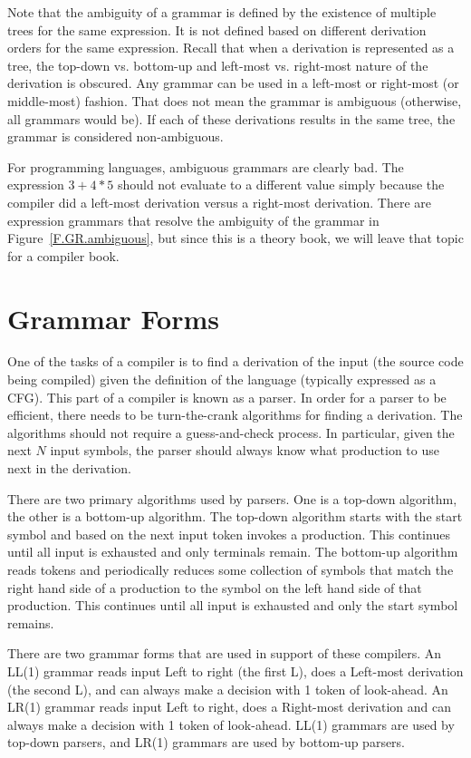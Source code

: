 \documentclass[letterpaper,12pt,openany,reqno]{book}%
\begin{document}
Note that the ambiguity of a grammar is defined by the existence of multiple trees for the same expression. It is not defined based on different derivation orders for the same expression. Recall that when a derivation is represented as a tree, the top-down vs. bottom-up and left-most vs. right-most nature of the derivation is obscured. Any grammar can be used in a left-most or right-most (or middle-most) fashion. That does not mean the grammar is ambiguous (otherwise, all grammars would be). If each of these derivations results in the same tree, the grammar is considered non-ambiguous.

For programming languages, ambiguous grammars are clearly bad. The expression $3+4*5$ should not evaluate to a different value simply because the compiler did a left-most derivation versus a right-most derivation. There are expression grammars that resolve the ambiguity of the grammar in Figure~\ref{F.GR.ambiguous}, but since this is a theory book, we will leave that topic for a compiler book.

\section {Grammar Forms}
One of the tasks of a compiler is to find a derivation of the input (the source code being compiled) given the definition of the language (typically expressed as a CFG). This part of a compiler is known as a parser. In order for a parser to be efficient, there needs to be turn-the-crank algorithms for finding a derivation. The algorithms should not require a guess-and-check process. In particular, given the next $N$ input symbols, the parser should always know what production to use next in the derivation.

There are two primary algorithms used by parsers. One is a top-down algorithm, the other is a bottom-up algorithm. The top-down algorithm starts with the start symbol and based on the next input token invokes a production. This continues until all input is exhausted and only terminals remain. The bottom-up algorithm reads tokens and periodically reduces some collection of symbols that match the right hand side of a production to the symbol on the left hand side of that production. This continues until all input is exhausted and only the start symbol remains.

There are two grammar forms that are used in support of these compilers. An LL(1) grammar reads input Left to right (the first L), does a Left-most derivation (the second L), and can always make a decision with 1 token of look-ahead. An LR(1) grammar reads input Left to right, does a Right-most derivation and can always make a decision with 1 token of look-ahead. LL(1) grammars are used by top-down parsers, and LR(1) grammars are used by bottom-up parsers.
\end{document}
